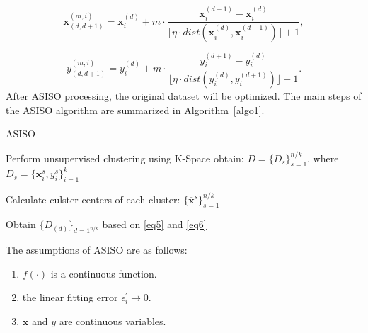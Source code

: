 \documentclass[sn-mathphys,Numbered]{sn-jnl}%
\theoremstyle{thmstyleone}%
\theoremstyle{thmstyletwo}%
\theoremstyle{thmstylethree}%
\begin{document}
\begin{equation}
\boldsymbol{x}_{(d,d+1)}^{(m,i)}=\boldsymbol{x}_i^{(d)}+m\cdot\dfrac{\boldsymbol{x}_i^{(d+1)}-\boldsymbol{x}_i^{(d)}}{\lfloor\eta\cdot dist(\boldsymbol{x}_i^{(d)},\boldsymbol{x}_i^{(d+1)})\rfloor+1},\label{eq7}
\end{equation}

\begin{equation}
y_{(d,d+1)}^{(m,i)}=y_i^{(d)}+m\cdot\dfrac{y_i^{(d+1)}-y_i^{(d)}}{\lfloor\eta\cdot dist(y_i^{(d)},y_i^{(d+1)})\rfloor+1}.\label{eq8}
\end{equation}
After ASISO processing, the original dataset will be optimized. The main steps of the ASISO algorithm are summarized in Algorithm~\ref{algo1}.

\begin{algorithm}[H] 
	\caption{ASISO}
	\label{algo1}
	\BlankLine
	Perform unsupervised clustering using K-Space obtain: 
        $D=\{D_s\}_{s=1}^{n/k}$, where $D_s=\{\boldsymbol{x}_i^s,y_i^s\}_{i=1}^k$

        Calculate culster centers of each cluster: 
        $\{\overline{\boldsymbol{x}}^s\}_{s=1}^{n/k}$

        Obtain $\{D_{(d)}\}_{d=1^{n/k}}$ based on \eqref{eq5} and \eqref{eq6}
        
\end{algorithm}

The assumptions of ASISO are as follows:

\begin{enumerate}[2.]

\item $f(\cdot)$ is a continuous function.

\item the linear fitting error $\epsilon_i^\prime\rightarrow0$.

\item $\boldsymbol{x}$ and $y$ are continuous variables.

\end{enumerate}
\end{document}
